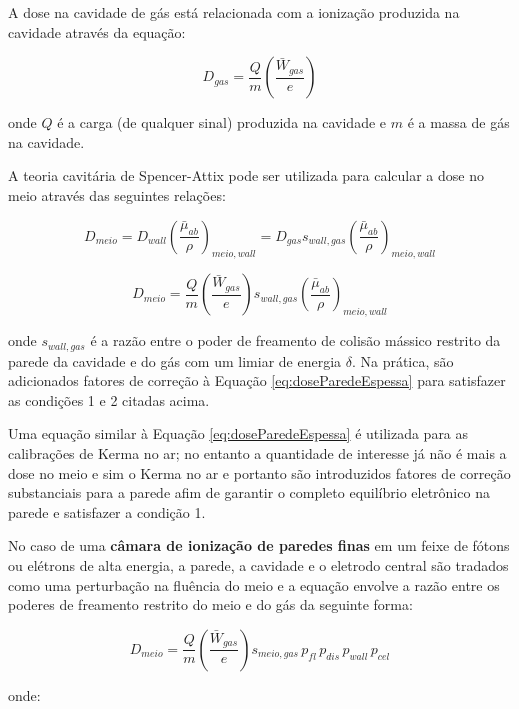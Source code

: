 \documentclass[11pt,a4paper]{article}
\begin{document}
			A dose na cavidade de gás está relacionada com a ionização produzida na cavidade através da equação:

				\begin{equation}
					D_{gas} = \frac{Q}{m}\left(\frac{\bar{W}_{gas}}{e}\right)
				\end{equation}

			\noindent onde $Q$ é a carga (de qualquer sinal) produzida na cavidade e $m$ é a massa de gás na cavidade.

			A teoria cavitária de Spencer-Attix pode ser utilizada para calcular a dose no meio através das seguintes relações:

			$$D_{meio} = D_{wall} \left(\frac{\bar{\mu}_{ab}}{\rho}\right)_{meio, wall} = D_{gas} s_{wall, gas}\left(\frac{\bar{\mu}_{ab}}{\rho}\right)_{meio, wall}$$

			\begin{equation}
				D_{meio} = \frac{Q}{m}\left(\frac{\bar{W}_{gas}}{e}\right)s_{wall, gas}\left(\frac{\bar{\mu}_{ab}}{\rho}\right)_{meio, wall}
				\label{eq:doseParedeEspessa}
			\end{equation}

			\noindent onde $s_{wall, gas}$ é a razão entre o poder de freamento de colisão mássico restrito da parede da cavidade e do gás com um limiar de energia $\delta$. Na prática, são adicionados fatores de correção à Equação \ref{eq:doseParedeEspessa} para satisfazer as condições 1 e 2 citadas acima.

			Uma equação similar à Equação \ref{eq:doseParedeEspessa} é utilizada para as calibrações de Kerma no ar; no entanto a quantidade de interesse já não é mais a dose no meio e sim o Kerma no ar e portanto são introduzidos fatores de correção substanciais para a parede afim de garantir o completo equilíbrio eletrônico na parede e satisfazer a condição 1.

			No caso de uma \textbf{\textcolor{CarnationPink}{câmara de ionização de paredes finas}} em um feixe de fótons ou elétrons de alta energia, a parede, a cavidade e o eletrodo central são tradados como uma perturbação na fluência do meio e a equação envolve a razão entre os poderes de freamento restrito do meio e do gás da seguinte forma:

				\begin{equation}
					D_{meio} = \frac{Q}{m}\left(\frac{\bar{W}_{gas}}{e}\right)s_{meio, gas}\, p_{fl}\, p_{dis}\, p_{wall}\, p_{cel}
				\end{equation}

			\noindent onde:
\end{document}
